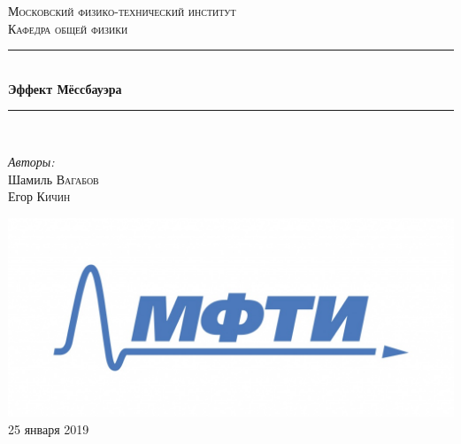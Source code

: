 \documentclass[12pt]{article}
\begin{document}
\begin{titlepage}

\newcommand{\HRule}{\rule{\linewidth}{0.5mm}} %

\center %
 

\textsc{\LARGE Московский физико-технический институт}\\[1.5cm] %
\textsc{\Large Кафедра общей физики}\\[0.5cm] %

\HRule \\[0.4cm]
{ \huge \bfseries Эффект Мёссбауэра}\\[0.4cm] 
\HRule \\[1.5cm]
 


\begin{minipage}{0.4\textwidth}
\begin{flushleft} \large
\emph{Авторы:}\\
Шамиль \textsc{Вагабов} \\
Егор \textsc{Кичин}
\end{flushleft}
\end{minipage}



\vspace{0mm}

\includegraphics[scale = 0.3]{final.jpg}\\[3 cm]

{\large 25 января 2019}\\[2cm] %



 

\end{titlepage}
\end{document}
